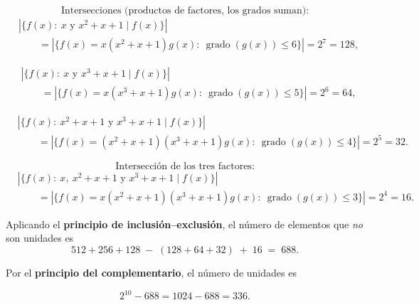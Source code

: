 \documentclass[a4paper,12pt]{article}
\begin{document}
\begin{ejercicio}[title=Ejercicio 10]

\[
\text{Intersecciones (productos de factores, los grados suman):}
\]
\[
\begin{aligned}
&\left|\{f(x):\ x \text{ y } x^2+x+1 \mid f(x)\}\right|
\\[4pt]
&\qquad=\left|\{f(x)=x(x^2+x+1)g(x):\ \operatorname{grado}(g(x))\le 6\}\right|
= 2^{7}=128,
\end{aligned}
\]

\[
\begin{aligned}
&\left|\{f(x):\ x \text{ y } x^3+x+1 \mid f(x)\}\right|
\\[4pt]
&\qquad=\left|\{f(x)=x(x^3+x+1)g(x):\ \operatorname{grado}(g(x))\le 5\}\right|
= 2^{6}=64,
\end{aligned}
\]

\[
\begin{aligned}
&\left|\{f(x):\ x^2+x+1 \text{ y } x^3+x+1 \mid f(x)\}\right|
\\[4pt]
&\qquad=\left|\{f(x)=(x^2+x+1)(x^3+x+1)g(x):\ \operatorname{grado}(g(x))\le 4\}\right|
= 2^{5}=32.
\end{aligned}
\]


\[
\text{Intersección de los tres factores:}
\]
\[
\begin{aligned}
&\left|\{f(x):\ x,\ x^2+x+1 \text{ y } x^3+x+1 \mid f(x)\}\right|
\\[4pt]
&\qquad=\left|\{f(x)=x(x^2+x+1)(x^3+x+1)g(x):\ \operatorname{grado}(g(x))\le 3\}\right|
= 2^{4}=16.
\end{aligned}
\]


Aplicando el \textbf{principio de inclusión–exclusión}, el número de elementos que \emph{no} son unidades es
\[
512 + 256 + 128 \;-\; (128 + 64 + 32) \;+\; 16 \;=\; 688.
\]

Por el \textbf{principio del complementario}, el número de unidades es

\[
2^{10} - 688 = 1024 - 688 = \boxed{336}.
\]

\end{ejercicio}
\end{document}
